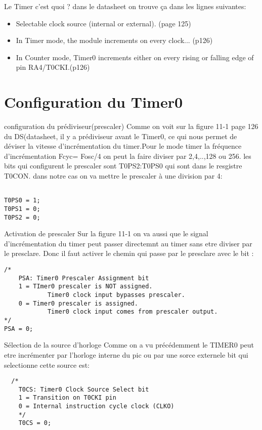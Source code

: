 \documentclass[french]{beamer}
\newcommand\justifyit{\rightskip0pt \leftskip0pt}
\begin{document}
\begin{frame}{Le Timer c'est quoi ?}
\justifyit
dans le datasheet on trouve ça dans les lignes suivantes:
\begin{itemize}
\item Selectable clock source (internal or external). (page 125)
\item In Timer mode, the module increments on every clock... (p126)
\item In Counter mode, Timer0 increments either on every rising or falling edge of pin RA4/T0CKI.(p126)
\end{itemize}

\end{frame}

\section{Configuration du Timer0}
\begin{frame}[fragile]{configuration du prédiviseur(prescaler)}
\justifyit
Comme on voit sur la figure 11-1 page 126 du DS(datasheet, il y a prédiviseur avant le 
Timer0, ce qui nous permet de déviser la vitesse d'incrémentation du timer.Pour le mode timer
la fréquence d'incrémentation Fcyc= Fosc/4 on peut la faire diviser par 2,4,..,128 ou 256.
les bits qui configurent le prescaler sont T0PS2:T0PS0 qui sont dans le resgistre T0CON.
dans notre cas on va mettre le prescaler à une division par 4:
\begin{verbatim}

T0PS0 = 1;
T0PS1 = 0;
T0PS2 = 0;
\end{verbatim}

\end{frame}

\begin{frame}[fragile]{Activation de prescaler}
\justifyit
Sur la figure 11-1 on va aussi que le signal d'incrémentation du timer peut passer directemnt
au timer sans etre diviser par le presclare. Donc il faut activer le chemin qui passe par le presclare avec le bit :
\begin{verbatim}
/*
    PSA: Timer0 Prescaler Assignment bit
    1 = TImer0 prescaler is NOT assigned. 
    		Timer0 clock input bypasses prescaler.
    0 = Timer0 prescaler is assigned. 
    		Timer0 clock input comes from prescaler output.
*/
PSA = 0;
\end{verbatim}

\end{frame}

\begin{frame}[fragile]{Sélection de la source d'horloge}
\justifyit
Comme on a vu précédemment le TIMER0 peut etre incrémenter par l'horloge interne du pic ou par une sorce externele bit qui selectionne cette source est:
\begin{verbatim}
  /*
    T0CS: Timer0 Clock Source Select bit
    1 = Transition on T0CKI pin
    0 = Internal instruction cycle clock (CLKO)
    */
    T0CS = 0;
\end{verbatim}



\end{frame}
\end{document}
